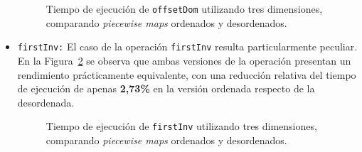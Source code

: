 \begin{itemize}
   \begin{figure}[htbp]
          \centering
          \caption{Tiempo de ejecución de \texttt{offsetDom} utilizando tres dimensiones, comparando \textit{piecewise maps} ordenados y desordenados.}
          \label{fig:Ren-off-3d}
        \end{figure}

    \item \texttt{firstInv:} 
    El caso de la operación \texttt{firstInv} resulta particularmente peculiar. 
    En la Figura~\ref{fig:Ren-firstInv-3d} se observa que ambas versiones de la 
    operación presentan un rendimiento prácticamente equivalente, con una reducción 
    relativa del tiempo de ejecución de apenas \textbf{2{,}73\%} en la versión 
    ordenada respecto de la desordenada.

   \begin{figure}[htbp]
          \centering
          \caption{Tiempo de ejecución de \texttt{firstInv} utilizando tres dimensiones, comparando \textit{piecewise maps} ordenados y desordenados.}
          \label{fig:Ren-firstInv-3d}
        \end{figure}


\end{itemize}

